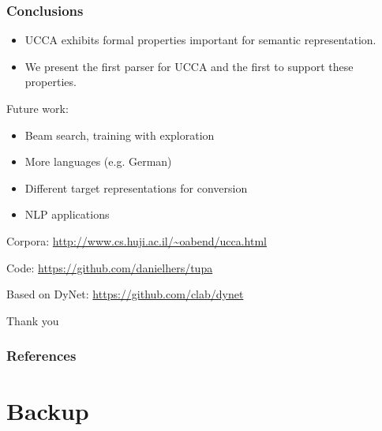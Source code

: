 \documentclass[t]{beamer}
\begin{document}
\begin{frame}
\frametitle{Conclusions}
\begin{itemize}
 \item UCCA exhibits formal properties important for semantic representation.
 \item We present the first parser for UCCA and the first to support these properties.
\end{itemize}

\vfill
Future work:
\begin{itemize}
 \item Beam search, training with exploration
 \item More languages (e.g. German)
 \item Different target representations for conversion
 \item NLP applications
\end{itemize}

\vfill
Corpora: \url{http://www.cs.huji.ac.il/~oabend/ucca.html}

Code: \url{https://github.com/danielhers/tupa}

Based on DyNet: \url{https://github.com/clab/dynet}
\end{frame}



\begin{frame}
\vfill
\begin{center}
\LARGE
Thank you
\end{center}
\end{frame}



\begin{frame}[allowframebreaks]
\frametitle{References}

\tiny
\end{frame}


\section{Backup}
\end{document}
